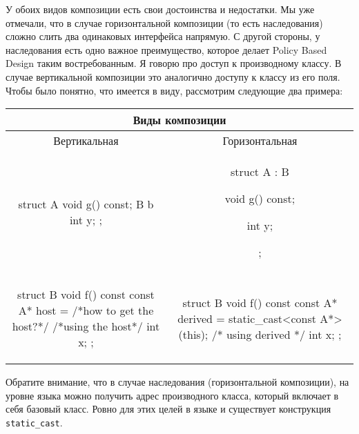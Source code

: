 У обоих видов композиции есть свои достоинства и недостатки.
Мы уже отмечали, что в случае горизонтальной композиции (то есть наследования) сложно слить два одинаковых интерфейса напрямую.
С другой стороны, у наследования есть одно важное преимущество, которое делает Policy Based Design таким востребованным.
Я говорю про доступ к производному классу.
В случае вертикальной композиции это аналогично доступу к классу из его поля.
Чтобы было понятно, что имеется в виду, рассмотрим следующие два примера:
\begin{center}
\begin{tabular}{c|c}
\multicolumn{2}{c}{Виды композиции}\\
\hline
{Вертикальная}&{Горизонтальная}\\
{
\begin{minipage}[\baselineskip]{8cm}
\begin{cppcode}[numbers = none]
struct A {
  void g() const;
  B b
  int y;
};
\end{cppcode}
\end{minipage}
}&{
\begin{minipage}[\baselineskip]{8cm}
\begin{cppcode}[numbers = none]
struct A : B {
  void g() const;

  int y;
};
\end{cppcode}
\end{minipage}
}\\
{
\begin{minipage}[\baselineskip]{8cm}
\begin{cppcode}[numbers = none]
struct B {
  void f() const {
    const A* host =
      /*how to get the host?*/
    /*using the host*/
  }
  int x;
};
\end{cppcode}
\end{minipage}
}&{
\begin{minipage}[\baselineskip]{8cm}
\begin{cppcode}[numbers = none]
struct B {
  void f() const {
    const A* derived =
      static_cast<const A*>(this);
    /* using derived */
  }
  int x;
};
\end{cppcode}
\end{minipage}
}\\
\end{tabular}
\end{center}
Обратите внимание, что в случае наследования (горизонтальной композиции), на уровне языка можно получить адрес производного класса, который включает в себя базовый класс.
Ровно для этих целей в языке и существует конструкция \verb"static_cast".
